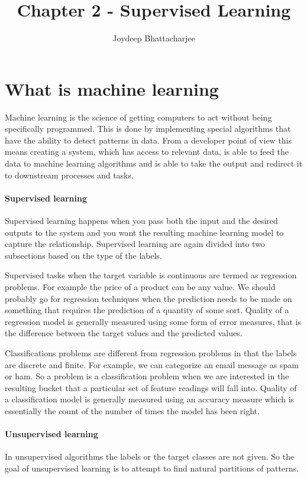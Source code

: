 \documentclass{book}
\begin{document}
\title{Chapter 2 - Supervised Learning }
\author {Joydeep Bhattacharjee}

\maketitle

\section{What is machine learning}
Machine learning is the science of getting computers to act without being specifically programmed. This is done by implementing special algorithms that have the ability to detect patterns in data. From a developer point of view this means creating a system, which has access to relevant data, is able to feed the data to machine learning algorithms and is able to take the output and redirect it to downstream processes and tasks.

\paragraph{Supervised learning}%
Supervised learning happens when you pass both the input and the desired outputs to the system and you want the resulting machine learning model to capture the relationship. Supervised learning are again divided into two subsections based on the type of the labels.

Supervised tasks when the target variable is continuous are termed as regression problems. For example the price of a product can be any value. We should probably go for regression techniques when the prediction needs to be made on something that requires the prediction of a quantity of some sort. Quality of a regression model is generally measured using some form of error measures, that is the difference between the target values and the predicted values.

Classifications problems are different from regression problems in that the labels are discrete and finite. For example, we can categorize an email message as spam or ham. So a problem is a classification problem when we are interested in the resulting bucket that a particular set of feature readings will fall into. Quality of a classification model is generally measured using an accuracy measure which is essentially the count of the number of times the model has been right.
\label{par:supervised_learning}

\paragraph{Unsupervised learning}%
In unsupervised algorithms the labels or the target classes are not given. So the goal of unsupervised learning is to attempt to find natural partitions of patterns.
\end{document}
